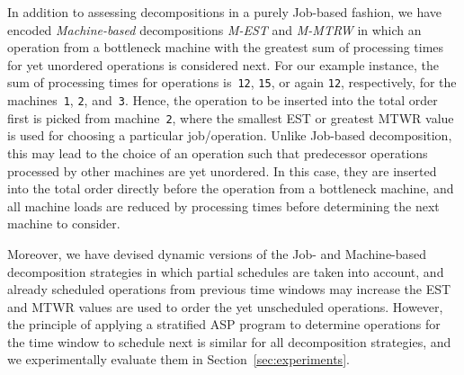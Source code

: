 \documentclass{tlp} %
\begin{document}
In addition to assessing decompositions in a purely Job-based fashion,
we have encoded \emph{Machine-based} decompositions \emph{M-EST} and \emph{M-MTRW} in which an operation from a bottleneck machine with the greatest sum of processing times for yet unordered operations is considered next.
For our example instance, the sum of processing times for operations 
is~\lstinline{12}, \lstinline{15}, or again \lstinline{12}, respectively,
for the machines~\lstinline{1}, \lstinline{2}, and~\lstinline{3}.
Hence, the operation to be inserted into the total order first is picked from
machine~\lstinline{2}, where the smallest EST or greatest MTWR value is
used for choosing a particular job/operation.
Unlike Job-based decomposition, this may lead to the choice of an operation
such that predecessor operations processed by other machines are yet unordered.
In this case, they are inserted into the total order directly before the
operation from a bottleneck machine,
and all machine loads are reduced by processing times
before determining the next machine to consider.

Moreover, we have devised dynamic versions of the Job- and Machine-based 
decomposition strategies in which partial schedules are taken into account,
and already scheduled operations from previous time windows may increase the
EST and MTWR values are used to order the yet unscheduled operations.
However, the principle of applying a stratified ASP program to determine
operations for the time window to schedule next is similar for all decomposition
strategies, and we experimentally evaluate them in Section~\ref{sec:experiments}.

\end{document}
